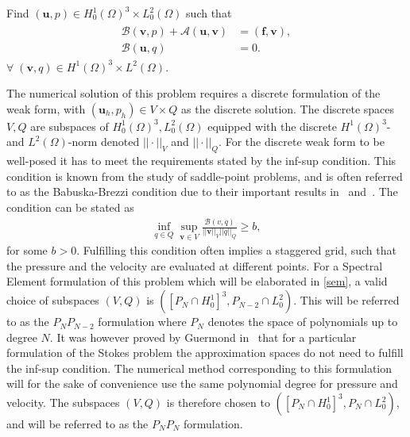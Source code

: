 Find $(\mathbf{u}, p) \in H^1_0(\Omega)^3\times L^2_0(\Omega)$ such that 
\begin{align}
    \begin{split}
           \mathcal{B}(\mathbf{v},p) 
         +\mathcal{A}(\mathbf{u},\mathbf{v}) &= (\mathbf{f},\mathbf{v}), \\
        \mathcal{B}(\mathbf{u},q) &= 0.
    \end{split}
	\label{eq:NSweak}
\end{align}
$\forall\; (\mathbf{v}, q) \in H^1(\Omega)^3\times L^2(\Omega)$.
%

The numerical solution of this problem requires a discrete formulation of the weak form, with $(\mathbf{u}_h,p_h)\in V\times Q$
as the discrete solution. The discrete spaces $V,Q$ are subspaces of $ H_0^1(\Omega)^{3},L^2_0(\Omega)$ equipped with the discrete
$ H^1(\Omega) ^3$- and $L^2(\Omega)$-norm denoted $||\cdot||_V$ and $||\cdot||_Q$. 
For the discrete weak form to be well-posed it has to meet the requirements stated by the
inf-sup condition. This condition is known from the study of saddle-point problems, and 
is often referred to as the Babuska-Brezzi condition due to their important results
in~\cite{Babuska} and~\cite{Brezzi}. The condition can be stated as
%
\begin{align}
    \inf_{q\in Q}\sup_{\mathbf{v}\in V}\frac{\mathcal{B}(v,q)}{||\mathbf{v}||_V||q||_Q} \ge b,
    \label{eq:infsup}
\end{align}
%
for some $b>0$. Fulfilling this condition often implies
a staggered grid, such that the pressure and the velocity are evaluated at different points. 
For a Spectral Element formulation of this problem which will be elaborated in \cref{sem},
a valid choice of subspaces $(V,Q)$ is $\left(  \left[  P_N\cap H^1_0\right]^3,P_{N-2} \cap L^{2}_{0}\right)$. This will be referred to as the 
$P_NP_{N-2}$ formulation where $P_N$ denotes the space of polynomials up to degree $N$.
It was however proved by Guermond in~\cite{GuermondPnPn} that for a particular formulation of the Stokes problem
the approximation spaces do not need to fulfill the inf-sup condition.
The numerical method corresponding to this formulation will for the sake of convenience use the same 
polynomial degree for pressure and velocity. The subspaces $(V,Q)$ is therefore chosen to 
$(\left[ P_N\cap H^1_0 \right]^3,P_{N} \cap L^{2}_{0})$,
and will be referred to as the $P_NP_N$ formulation.

